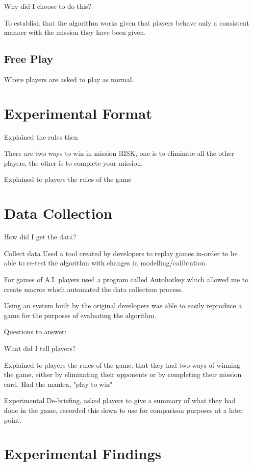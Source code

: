 \documentclass[parskip]{cs4rep}
\begin{document}
Why did I choose to do this?

To establish that the algorithm works given that players behave only a consistent manner with the mission they have been given.

\subsection{Free Play}

Where players are asked to play as normal.

\section{Experimental Format}

Explained the rules then

There are two ways to win in mission RISK, one is to eliminate all the other players, the other is to complete your mission.

Explained to players the rules of the game 

\section{Data Collection}

How did I get the data?

Collect data
Used a tool created by developers to replay games in-order to be able to re-test the algorithm with changes in modelling/calibration.

For games of A.I. players used a program called Autohotkey which allowed me to create macros which automated the data collection process.

Using an system built by the original developers was able to easily reproduce a game for the purposes of evaluating the algorithm.

Questions to answer:

What did I tell players?

Explained to players the rules of the game, that they had two ways of winning the game, either by eliminating their opponents or by completing their mission card. Had the mantra, "play to win"

Experimental De-briefing, asked players to give a summary of what they had done in the game, recorded this down to use for comparison purposes at a later point.

\section{Experimental Findings}
\end{document}
